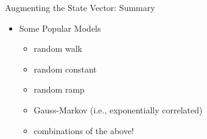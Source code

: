 \begin{frame}
Augmenting the State Vector:  Summary
\begin{itemize}
  \item Some Popular Models
\begin{itemize}
	\item random walk
	\item random constant
	\item random ramp
	\item Gauss-Markov (i.e., exponentially correlated)
	\item combinations of the above!
\end{itemize}
\end{itemize} 
\end{frame}

